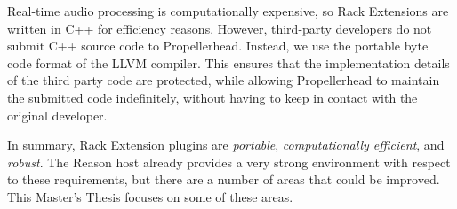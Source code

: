Real-time audio processing is computationally expensive, so Rack Extensions are
written in C++ for efficiency reasons.
However, third-party developers do not submit C++ source code to Propellerhead.
Instead, we use the portable byte code format of the LLVM compiler.
This ensures that the implementation details of the third party code are
protected, while allowing Propellerhead to maintain the submitted code
indefinitely, without having to keep in contact with the original developer.

In summary, Rack Extension plugins are \emph{portable}, \emph{computationally
efficient}, and \emph{robust}.
The Reason host already provides a very strong environment with respect to these
requirements, but there are a number of areas that could be improved.
This Master’s Thesis focuses on some of these areas.
